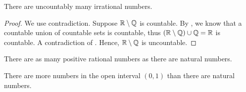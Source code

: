 \documentclass[11pt,twoside=off,numbers=noenddot]{scrbook}
\begin{document}
\begin{theorem}
    There are uncountably many irrational numbers.
\end{theorem}

\begin{proof}
    We use contradiction. Suppose $\mathbb R \setminus \mathbb Q$ is countable. By , we know that a countable union of countable sets is countable, thus $(\mathbb R \setminus \mathbb Q) \cup \mathbb Q = \mathbb R$ is countable. A contradiction of . Hence, $\mathbb R \setminus \mathbb Q$ is uncountable.
\end{proof}

\begin{theorem}[$\size{\QQ_+} = \size{\NN}$]
    There are as many positive rational numbers as there are natural numbers.
\end{theorem}

\begin{theorem}
    There are more numbers in the open interval $(0, 1)$ than there are natural numbers.
\end{theorem}
\end{document}
